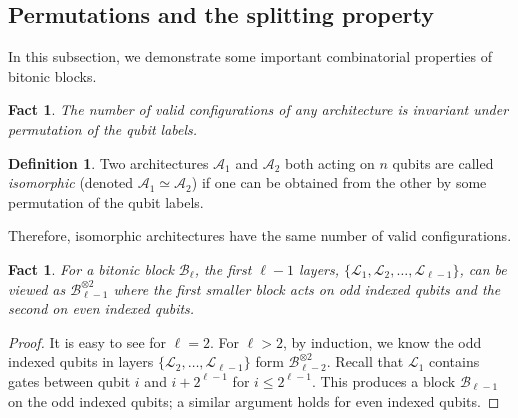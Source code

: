 \documentclass[11pt,letterpaper]{article}
\newtheorem{fact}[theorem]{Fact}
\theoremstyle{definition}
\newtheorem{definition}[theorem]{Definition}
\theoremstyle{remark}
\newcommand{\cA}{\mathcal A}
\newcommand{\cB}{\mathcal B}
\newcommand{\cL}{\mathcal L}
\renewcommand{\leq}{\leqslant}
\numberwithin{equation}{section}
\theoremstyle{definition}
\begin{document}
\subsection{Permutations and the splitting property}\label{sec:permutationSplitting}

In this subsection, we demonstrate some important combinatorial properties of bitonic blocks. 

%

\begin{fact}
  The number of valid configurations of any architecture is invariant under permutation of the qubit labels.
\end{fact}
%
%
%

\begin{definition}
Two architectures $\cA_1$ and $\cA_2$ both acting on $n$ qubits are called \emph{isomorphic} (denoted $\cA_1 \simeq \cA_2$) if one can be obtained from the other by some permutation of the qubit labels.
\end{definition}

Therefore, isomorphic architectures have the same number of valid configurations.

%
%
%

%

\begin{fact}
\label{fact:penultimatelayers}
For a bitonic block $\cB_\ell$, the first $\ell - 1$ layers, $\{\cL_1, \cL_2, \ldots, \cL_{\ell - 1}\}$, can be viewed as $\cB_{\ell-1}^{\otimes 2}$ where the first smaller block acts on odd indexed qubits and the second on even indexed qubits.
\end{fact}

\begin{proof}
It is easy to see for $\ell = 2$. For $\ell > 2$, by induction, we know the odd indexed qubits in layers $\{\cL_2, \ldots, \cL_{\ell - 1}\}$ form $\cB_{\ell - 2}^{\otimes 2}$. Recall that $\cL_1$ contains gates between qubit $i$ and $i + 2^{\ell - 1}$ for $i \leq 2^{\ell - 1}$. This produces a block $\cB_{\ell - 1}$ on the odd indexed qubits; a similar argument holds for even indexed qubits.
\end{proof}
\end{document}
